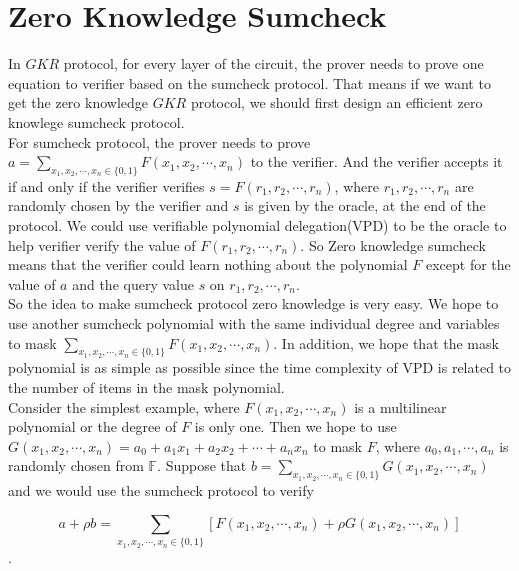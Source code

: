 

\section{Zero Knowledge Sumcheck}

In $GKR$ protocol, for every layer of the circuit, the prover needs to prove one equation to verifier based on the sumcheck protocol. That means if we want to get the zero knowledge $GKR$ protocol, we should first design an efficient zero knowlege sumcheck protocol.\\

\noindent
For sumcheck protocol, the prover needs to prove $a = \sum\limits_{x_1, x_2, \cdots, x_n \in \{0, 1\}}F(x_1, x_2, \cdots, x_n)$ to the verifier. And the verifier accepts it if and only if the verifier verifies $s = F(r_1, r_2, \cdots, r_n)$, where $r_1, r_2, \cdots, r_n$ are randomly chosen by the verifier and $s$ is given by the oracle, at the end of the protocol. We could use verifiable polynomial delegation(VPD) to be the oracle to help verifier verify the value of $F(r_1, r_2, \cdots, r_n)$. So Zero knowledge sumcheck means that the verifier could learn nothing about the polynomial $F$ except for the value of $a$ and the query value $s$ on $r_1, r_2, \cdots, r_n$.\\

\noindent
So the idea to make sumcheck protocol zero knowledge is very easy. We hope to use another sumcheck polynomial with the same individual degree and variables to mask $\sum\limits_{x_1, x_2, \cdots, x_n \in \{0, 1\}}F(x_1, x_2, \cdots, x_n)$. In addition, we hope that the mask polynomial is as simple as possible since the time complexity of VPD is related to the number of items in the mask polynomial.\\

\noindent
Consider the simplest example, where $F(x_1, x_2, \cdots, x_n)$ is a multilinear polynomial or the degree of $F$ is only one. Then we hope to use $G(x_1, x_2, \cdots, x_n) = a_0 + a_1x_1 + a_2x_2 + \cdots + a_nx_n$ to mask $F$, where $a_0, a_1, \cdots, a_n$ is randomly chosen from $\mathbb{F}$. Suppose that $b = \sum\limits_{x_1, x_2, \cdots, x_n \in \{0, 1\}}G(x_1, x_2, \cdots, x_n)$ and we would use the sumcheck protocol to verify

$$a + \rho b = \sum\limits_{x_1, x_2, \cdots, x_n \in \{0, 1\}}[F(x_1, x_2, \cdots, x_n) + \rho G(x_1, x_2, \cdots, x_n)]$$. 

